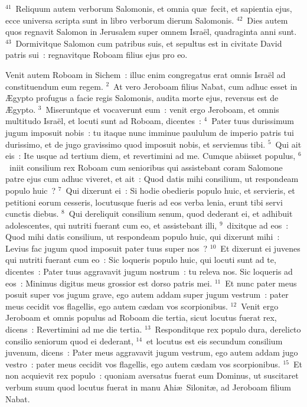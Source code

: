 ${}^{41}$~Reliquum autem verborum Salomonis, et omnia qu\ae\ fecit, et sapientia ejus, ecce universa scripta sunt in libro verborum dierum Salomonis.
${}^{42}$~Dies autem quos regnavit Salomon in Jerusalem super omnem Isra\"el, quadraginta anni sunt.
${}^{43}$~Dormivitque Salomon cum patribus suis, et sepultus est in civitate David patris sui~: regnavitque Roboam filius ejus pro eo.

\bchapter
\lettrine[lines=3,image=true,loversize=0.05,lraise=-0.03]{V}{}enit autem Roboam in Sichem~: illuc enim congregatus erat omnis Isra\"el ad constituendum eum regem.
${}^{2}$~At vero Jeroboam filius Nabat, cum adhuc esset in \AE gypto profugus a facie regis Salomonis, audita morte ejus, reversus est de \AE gypto.
${}^{3}$~Miseruntque et vocaverunt eum~: venit ergo Jeroboam, et omnis multitudo Isra\"el, et locuti sunt ad Roboam, dicentes~:
${}^{4}$~Pater tuus durissimum jugum imposuit nobis~: tu itaque nunc imminue paululum de imperio patris tui durissimo, et de jugo gravissimo quod imposuit nobis, et serviemus tibi.
${}^{5}$~Qui ait eis~: Ite usque ad tertium diem, et revertimini ad me. Cumque abiisset populus,
${}^{6}$~iniit consilium rex Roboam cum senioribus qui assistebant coram Salomone patre ejus cum adhuc viveret, et ait~: Quod datis mihi consilium, ut respondeam populo huic~?
${}^{7}$~Qui dixerunt ei~: Si hodie obedieris populo huic, et servieris, et petitioni eorum cesseris, locutusque fueris ad eos verba lenia, erunt tibi servi cunctis diebus.
${}^{8}$~Qui dereliquit consilium senum, quod dederant ei, et adhibuit adolescentes, qui nutriti fuerant cum eo, et assistebant illi,
${}^{9}$~dixitque ad eos~: Quod mihi datis consilium, ut respondeam populo huic, qui dixerunt mihi~: Levius fac jugum quod imposuit pater tuus super nos~?
${}^{10}$~Et dixerunt ei juvenes qui nutriti fuerant cum eo~: Sic loqueris populo huic, qui locuti sunt ad te, dicentes~: Pater tuus aggravavit jugum nostrum~: tu releva nos. Sic loqueris ad eos~: Minimus digitus meus grossior est dorso patris mei.
${}^{11}$~Et nunc pater meus posuit super vos jugum grave, ego autem addam super jugum vestrum~: pater meus cecidit vos flagellis, ego autem c\ae dam vos scorpionibus.
${}^{12}$~Venit ergo Jeroboam et omnis populus ad Roboam die tertia, sicut locutus fuerat rex, dicens~: Revertimini ad me die tertia.
${}^{13}$~Responditque rex populo dura, derelicto consilio seniorum quod ei dederant,
${}^{14}$~et locutus est eis secundum consilium juvenum, dicens~: Pater meus aggravavit jugum vestrum, ego autem addam jugo vestro~: pater meus cecidit vos flagellis, ego autem c\ae dam vos scorpionibus.
${}^{15}$~Et non acquievit rex populo~: quoniam aversatus fuerat eum Dominus, ut suscitaret verbum suum quod locutus fuerat in manu Ahi\ae\ Silonit\ae , ad Jeroboam filium Nabat.


